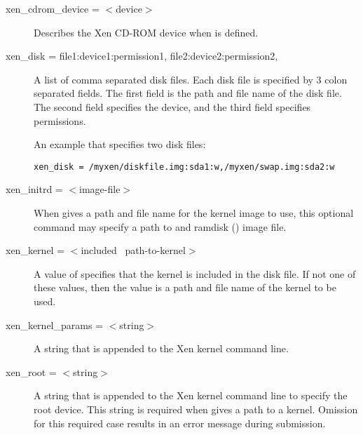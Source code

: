 \begin{description}

\item[xen\_cdrom\_device = $<$device$>$]
Describes the Xen CD-ROM device when
 is defined.


\item[xen\_disk = file1:device1:permission1, file2:device2:permission2, \Dots]
A list of comma separated disk files.
Each disk file is specified by 3 colon separated fields.
The first field is the path and file name of the disk file.
The second field specifies the device, and
the third field specifies permissions.

An example that specifies two disk files:
\footnotesize
\begin{verbatim}
xen_disk = /myxen/diskfile.img:sda1:w,/myxen/swap.img:sda2:w
\end{verbatim}
\normalsize


\item[xen\_initrd = $<$image-file$>$]
When  gives a path and file name for
the kernel image to use, 
this optional command may specify a path to and ramdisk 
() image file.


\item[xen\_kernel = $<$included \Bar\  path-to-kernel$>$]
A value of  specifies that the kernel is
included in the disk file.
If not one of these values, then the value is a path and
file name of the kernel to be used.


\item[xen\_kernel\_params = $<$string$>$]
A string that is appended to the Xen kernel command line.


\item[xen\_root = $<$string$>$]
A string that is appended to the Xen kernel command line
to specify the root device. This string is required when
 gives a path to a kernel.  Omission 
for this required case results in an error message during 
submission.


\end{description}

